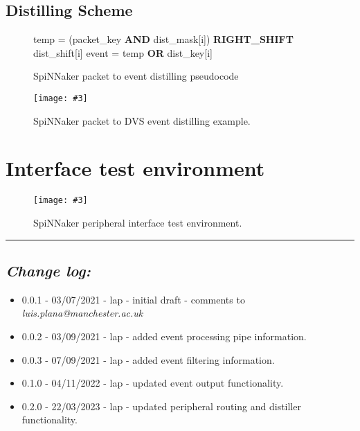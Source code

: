 \documentclass[11pt,a4paper,twoside]{article}
\newcommand{\image}[5][]
{
\begin{figure}[#2]
   \begin{center}
      \texttt{[image: \#3]}
      \caption{#5}
      \label{fig:#4}
   \end{center}
\end{figure}
}
\begin{document}
\vspace{5mm}
\subsection{Distilling Scheme}


\begin{figure}[!ht]
	\centering
	\begin{minipage}{\columnwidth}
		\begin{algorithm}[H]
			\caption{SpiNNaker packet to event distilling pseudocode}
			\begin{algorithmic}[1]
						\State temp = (packet\_key \textbf{AND} dist\_mask[i]) \textbf{RIGHT\_SHIFT} dist\_shift[i]
						\State event = temp \textbf{OR} dist\_key[i]
					\EndIf
				\EndFor
			\end{algorithmic}
			\label{alg:distiller}
		\end{algorithm}
	\end{minipage}
\end{figure}


\image[width = 0.9 \textwidth]{!h}{dist_ex}{fig:dist_fig}
{SpiNNaker packet to DVS event distilling example.}



\clearpage
\section{Interface test environment}


\image[width = 0.8 \textwidth]{!h}{spif_test_env}{fig:spif_test}
{SpiNNaker peripheral interface test environment.}


\vspace*{1.0cm}
\par\noindent\rule{\linewidth}{2pt}


\subsection*{\itshape Change log:}


\begin{itemize}
	 mm 
	\item 0.0.1 - 03/07/2021 - lap - initial draft - comments to {\itshape luis.plana@manchester.ac.uk}
	\item 0.0.2 - 03/09/2021 - lap - added event processing pipe information.
	\item 0.0.3 - 07/09/2021 - lap - added event filtering information.
	\item 0.1.0 - 04/11/2022 - lap - updated event output functionality.
	\item 0.2.0 - 22/03/2023 - lap - updated peripheral routing and distiller functionality.
\end{itemize}
\end{document}
